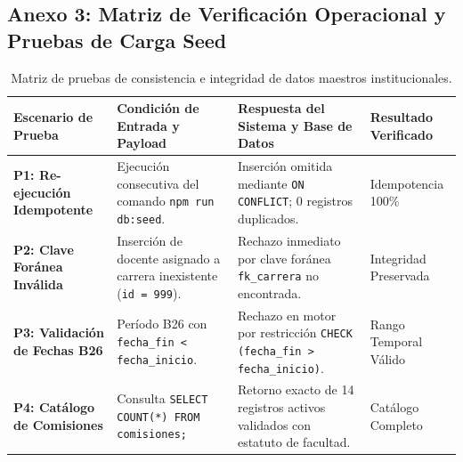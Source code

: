 \documentclass[12pt,a4paper]{article}
\begin{document}
\subsection*{Anexo 3: Matriz de Verificación Operacional y Pruebas de Carga Seed}
\begin{table}[H]
\centering
\small
\renewcommand{\arraystretch}{1.15}
\begin{tabularx}{\textwidth}{|>{\hsize=0.75\hsize\raggedright\arraybackslash\bfseries\footnotesize}X|>{\hsize=1.25\hsize\raggedright\arraybackslash\footnotesize}X|>{\hsize=1.35\hsize\raggedright\arraybackslash\footnotesize}X|>{\hsize=0.65\hsize\centering\arraybackslash\footnotesize}X|}
\hline
\rowcolor{tableheader}
\textbf{Escenario de Prueba} & \textbf{Condición de Entrada y Payload} & \textbf{Respuesta del Sistema y Base de Datos} & \textbf{Resultado Verificado} \\
\hline
P1: Re-ejecución Idempotente & Ejecución consecutiva del comando \texttt{npm run db:seed}. & Inserción omitida mediante \texttt{ON CONFLICT}; 0 registros duplicados. & Idempotencia 100\% \\
\hline
P2: Clave Foránea Inválida & Inserción de docente asignado a carrera inexistente (\texttt{id = 999}). & Rechazo inmediato por clave foránea \texttt{fk\_\allowbreak  carrera} no encontrada. & Integridad Preservada \\
\hline
P3: Validación de Fechas B26 & Período B26 con \texttt{fecha\_\allowbreak  fin < fecha\_\allowbreak  inicio}. & Rechazo en motor por restricción \texttt{CHECK (fecha\_\allowbreak  fin > fecha\_\allowbreak  inicio)}. & Rango Temporal Válido \\
\hline
P4: Catálogo de Comisiones & Consulta \texttt{SELECT COUNT(*) FROM comisiones;} & Retorno exacto de 14 registros activos validados con estatuto de facultad. & Catálogo Completo \\
\hline
\end{tabularx}
\caption{Matriz de pruebas de consistencia e integridad de datos maestros institucionales.}
\end{table}
\end{document}
